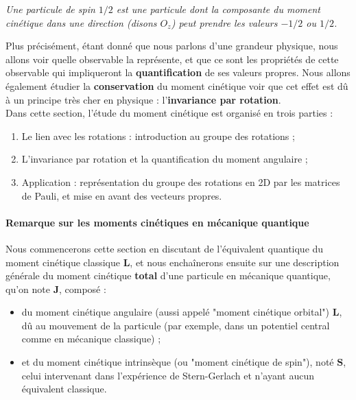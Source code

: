 \documentclass[../notesdecours.tex]{subfiles}
\begin{document}
\begin{leftbar}
    \textit{Une particule de spin $1/2$ est une particule dont la composante du moment cinétique dans une direction (disons $O_z$) peut prendre les valeurs $-1/2$ ou $1/2$. }
\end{leftbar}

Plus précisément, étant donné que nous parlons d'une grandeur physique, nous allons voir quelle observable la représente, et que ce sont les propriétés de cette observable qui impliqueront la \textbf{quantification} de ses valeurs propres. Nous allons également étudier la \textbf{conservation} du moment cinétique voir que cet effet est dû à un principe très cher en physique : l'\textbf{invariance par rotation}. \\

Dans cette section, l'étude du moment cinétique est organisé en trois parties :
\begin{enumerate}
    \item Le lien avec les rotations : introduction au groupe des rotations ;
    \item L'invariance par rotation et la quantification du moment angulaire ;
    \item Application : représentation du groupe des rotations en 2D par les matrices de Pauli, et mise en avant des vecteurs propres.
\end{enumerate} 

\paragraph{Remarque sur les moments cinétiques en mécanique quantique}
Nous commencerons cette section en discutant de l'équivalent quantique du moment cinétique classique $\mathcal{\mathbf{L}}$, et nous enchaînerons ensuite sur une description générale du moment cinétique \textbf{total} d'une particule en mécanique quantique, qu'on note $\mathbf{J}$, composé :
\begin{itemize}
    \item du moment cinétique angulaire (aussi appelé "moment cinétique orbital") $\mathbf{L}$, dû au mouvement de la particule (par exemple, dans un potentiel central comme en mécanique classique) ;
    \item et du moment cinétique intrinsèque (ou "moment cinétique de spin"), noté $\mathbf{S}$, celui intervenant dans l'expérience de Stern-Gerlach et n'ayant aucun équivalent classique.
\end{itemize}
\end{document}
